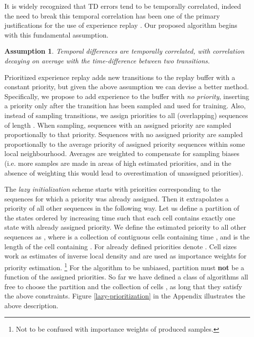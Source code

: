 \documentclass{article}
\newtheorem{assume}{Assumption}
\begin{document}
It is widely recognized that TD errors tend to be temporally correlated, indeed 
the need to 
break this temporal correlation has been one of the primary justifications for 
the use of experience replay \citep{mnih15human}. Our proposed algorithm begins 
with this fundamental assumption.
\begin{assume}
Temporal differences are temporally correlated, with correlation decaying 
on average with the time-difference between two transitions.
\end{assume}
Prioritized experience replay adds new transitions to the replay buffer with a 
constant priority, but given the above assumption we can devise a better 
method. Specifically, we propose to add experience to the buffer with 
\textit{no 
priority}, inserting a priority only after the transition has been 
sampled and used for training. Also, instead of sampling transitions, we 
assign priorities to all (overlapping) sequences of length . When sampling, 
sequences with an assigned 
priority are sampled proportionally to that priority. Sequences with no 
assigned 
priority are sampled proportionally to the average priority of 
assigned priority sequences within some local neighbourhood. Averages are 
weighted to compensate for sampling biases (i.e. more samples 
are made in areas of high estimated priorities, and in the absence of 
weighting this would lead to overestimation of unassigned priorities).

The \textit{lazy initialization} 
scheme starts with priorities  corresponding to the sequences
 for which a priority was already 
assigned. Then it extrapolates a priority of all other sequences in the 
following way. Let us define a partition  of the states ordered by 
increasing time such that each cell  contains exactly one state  with 
already assigned priority. We define the estimated priority  to 
all other sequences as , where 
 is a collection of contiguous cells  containing time 
, and  is the length of the cell  containing .
For already defined priorities denote . 
Cell sizes work as estimates of inverse local density and are 
used as importance weights for priority estimation.
\footnote{Not to be confused with importance weights of produced samples.} 
For the algorithm to be unbiased, partition  must 
{\bf not} be a function of the assigned priorities.
So far we have defined a class of algorithms all free to choose the 
partition  and the collection of cells , as long that they satisfy 
the above constraints. Figure 
\ref{lazy-prioritization} in the Appendix illustrates the above description.
\end{document}
